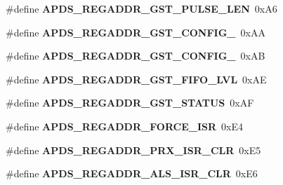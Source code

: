 \begin{DoxyCompactItemize}
\item 
\mbox{\label{group__APDS9960__FunctionDefines_ga091dd5929f1f2e19e80e50fa400cdc71}} 
\#define {\bfseries A\+P\+D\+S\+\_\+\+R\+E\+G\+A\+D\+D\+R\+\_\+\+G\+S\+T\+\_\+\+P\+U\+L\+S\+E\+\_\+\+L\+EN}~0x\+A6
\item 
\mbox{\label{group__APDS9960__FunctionDefines_ga7c9271203deb3a3bc13c04443957f12c}} 
\#define {\bfseries A\+P\+D\+S\+\_\+\+R\+E\+G\+A\+D\+D\+R\+\_\+\+G\+S\+T\+\_\+\+C\+O\+N\+F\+I\+G\+\_}~0x\+AA
\item 
\mbox{\label{group__APDS9960__FunctionDefines_gaa2b68512d90b2f77a3b74a2a744398c9}} 
\#define {\bfseries A\+P\+D\+S\+\_\+\+R\+E\+G\+A\+D\+D\+R\+\_\+\+G\+S\+T\+\_\+\+C\+O\+N\+F\+I\+G\+\_}~0x\+AB
\item 
\mbox{\label{group__APDS9960__FunctionDefines_gab62fa567f1b8cba875b8bfc88f2f814f}} 
\#define {\bfseries A\+P\+D\+S\+\_\+\+R\+E\+G\+A\+D\+D\+R\+\_\+\+G\+S\+T\+\_\+\+F\+I\+F\+O\+\_\+\+L\+VL}~0x\+AE
\item 
\mbox{\label{group__APDS9960__FunctionDefines_ga952e3b8c7b041b9130c3040e523533d1}} 
\#define {\bfseries A\+P\+D\+S\+\_\+\+R\+E\+G\+A\+D\+D\+R\+\_\+\+G\+S\+T\+\_\+\+S\+T\+A\+T\+US}~0x\+AF
\item 
\mbox{\label{group__APDS9960__FunctionDefines_ga7b7ebda5d18ba26a0aea096b1ddc461f}} 
\#define {\bfseries A\+P\+D\+S\+\_\+\+R\+E\+G\+A\+D\+D\+R\+\_\+\+F\+O\+R\+C\+E\+\_\+\+I\+SR}~0x\+E4
\item 
\mbox{\label{group__APDS9960__FunctionDefines_ga3bfbf3ba936acb80e0bd783ba037a09e}} 
\#define {\bfseries A\+P\+D\+S\+\_\+\+R\+E\+G\+A\+D\+D\+R\+\_\+\+P\+R\+X\+\_\+\+I\+S\+R\+\_\+\+C\+LR}~0x\+E5
\item 
\mbox{\label{group__APDS9960__FunctionDefines_gae33de91c08d5e48c61869880e7ac3d32}} 
\#define {\bfseries A\+P\+D\+S\+\_\+\+R\+E\+G\+A\+D\+D\+R\+\_\+\+A\+L\+S\+\_\+\+I\+S\+R\+\_\+\+C\+LR}~0x\+E6
\item 

\end{DoxyCompactItemize}

